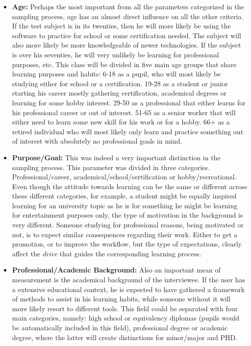\begin{itemize}
    \item \textbf{Age: } Perhaps the most important from all the 
	parameters categorized
        in the sampling process, age has an almost direct influence 
	on all the other criteria. If the test subject is in its 
	twenties, then he will more likely 
        be using the software to practice for school or some 
	certification needed. The subject will also more likely be 
	more knowledgeable of newer technologies. If
        the subject is over his seventies, he will very 
	unlikely be learning for
        professional purposes, etc. 
	This class will be divided in five main age groups that share 
	learning purposes and habits: 6-18 as a pupil, who will most likely
	be studying either for school or a certification. 19-28 as a student
	or junior starting his career mostly gathering certification, academical
	degrees or learning for some hobby interest. 29-50 as a professional
	that either learns for his professional career or out of interest.
	51-65 as a senior worker that will either need to learn some new skill
	for his work or for a hobby. 66+ as a retired individual who will 
	most likely only learn and practice something out of interest with
	absolutely no professional goals in mind.

    \item \textbf{Purpose/Goal: } This was indeed a very important 
	distinction in the sampling process. This parameter 
	was divided in three categories.
	Professional/career, academical/school/certification or 
	hobby/recreational. Even though the attitude towards learning
	can be the same or different across these different categories,
	for example, a student might be equally inspired learning 
	for an university topic as he is for something he might be
	learning for entertainment purposes only, the type of
	motivation in the background is very different. 
	Someone studying for professional reasons, being motivated or
	not, is to expect similar consequences regarding their work.
	Either to get a promotion, or to improve the workflow, but the type
	of expectations, clearly affect the \textit{drive} that guides the corresponding learning 
	process.
	

    \item \textbf{Professional/Academic Background: }
	Also an important mean of measurement is the academical background 
	of the interviewee. If the user has a extensive educational context,
	he is expected to have gathered a framework of methods to assist in
	his learning habits, while someone without it will more likely resort
	to different tools.
	This field could be separated with four main categories, namely:
	high school or equivalency diplomas (pupils would be automatically
	included in this field), professional degree or academic degree, where
	the latter will create distinctions for minor/major and PHD.


\end{itemize}
